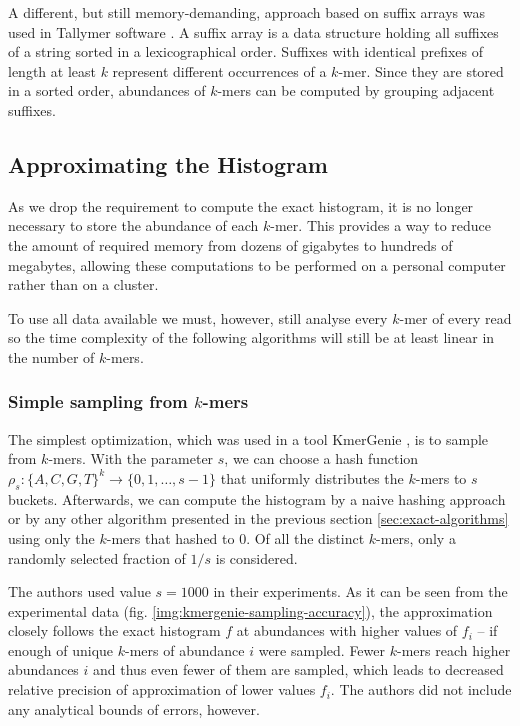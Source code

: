 A different, but still memory-demanding, approach based on suffix arrays was
used in Tallymer software \cite{Kurtz2008}. A suffix array is a data structure
holding all suffixes of a string sorted in a lexicographical order. Suffixes with identical
prefixes of length at least $k$ represent different occurrences of a $k$-mer. Since
they are stored in a sorted order, abundances of $k$-mers can be computed by
grouping adjacent suffixes. 

\subsection{Approximating the Histogram}
As we drop the requirement to compute the exact histogram, it is no longer necessary to
store the abundance of each $k$-mer. This provides a way to reduce the amount of required
memory from dozens of gigabytes to hundreds of megabytes, allowing these computations to
be performed on a personal computer rather than on a cluster.  

To use all data available we must, however, still analyse every $k$-mer of every read so the
time complexity of the following algorithms will still be at least
linear in the number of $k$-mers.

\subsubsection{Simple sampling from $k$-mers}
\label{sec:simple-sampling}
The simplest optimization, which was used in a tool KmerGenie \cite{Chikhi2013},
is to sample from $k$-mers. With the parameter $s$, we can choose a hash function 
$\rho_s: \{A,C,G,T\}^k \rightarrow \{0, 1, \dots, s-1\}$ that uniformly distributes
the $k$-mers to $s$ buckets. Afterwards, we can compute the histogram by a naive
hashing approach or by any other algorithm presented in the previous section
\ref{sec:exact-algorithms} using only the $k$-mers that hashed to 0. 
Of all the distinct $k$-mers, only a randomly selected fraction of $1/s$ is considered.

The authors used value $s=1000$ in their experiments. As it can be seen from the
experimental data (fig. \ref{img:kmergenie-sampling-accuracy}), the approximation closely
follows the exact histogram $f$ at abundances with higher values of $f_i$ -- if enough
of unique $k$-mers of abundance $i$ were sampled. Fewer $k$-mers reach higher abundances
$i$ and thus even fewer of them are sampled, which leads to decreased relative precision
of approximation of lower values $f_i$. The authors did not include 
any analytical bounds of errors, however.

